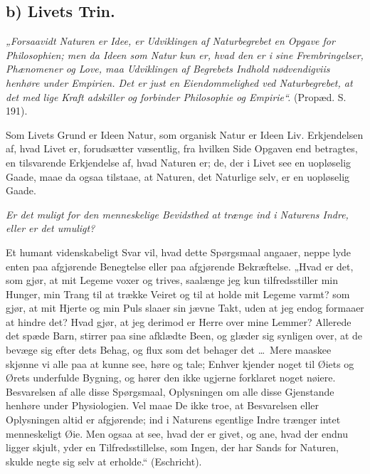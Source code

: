 \documentclass[12pt,a4paper]{book}
\begin{document}
\subsection*{b) Livets Trin.}

\emph{„Forsaavidt Naturen er Idee, er Udviklingen af Naturbegrebet en
Opgave for Philosophien; men da Ideen som Natur kun er, hvad den er i
sine Frembringelser, Phænomener og Love, maa Udviklingen af Begrebets
Indhold nødvendigviis henhøre under Empirien. Det er just en
Eiendommelighed ved Naturbegrebet, at det med lige Kraft adskiller og
forbinder Philosophie og Empirie“.} (Propæd. S. 191).

Som Livets Grund er Ideen Natur, som organisk Natur er Ideen Liv.
Erkjendelsen af, hvad Livet er, forudsætter væsentlig, fra hvilken Side
Opgaven end betragtes, en tilsvarende Erkjendelse af, hvad Naturen er;
de, der i Livet see en uopløselig Gaade, maae da ogsaa tilstaae, at
Naturen, det Naturlige selv, er en uopløselig Gaade.

\emph{Er det muligt for den menneskelige Bevidsthed at trænge ind i
Naturens Indre, eller er det umuligt?}

Et humant videnskabeligt Svar vil, hvad dette Spørgsmaal angaaer, neppe
lyde enten paa afgjørende Benegtelse eller paa afgjørende Bekræftelse.
„Hvad er det, som gjør, at mit Legeme voxer og trives, saalænge jeg kun
tilfredsstiller min Hunger, min Trang til at trække Veiret og til at
holde mit Legeme varmt? som gjør, at mit Hjerte og min Puls slaaer sin
jævne Takt, uden at jeg endog formaaer at hindre det? Hvad gjør, at jeg
derimod er Herre over mine Lemmer? Allerede det spæde Barn, stirrer paa
sine afklædte Been, og
glæder sig synligen over, at de bevæge sig efter dets Behag, og flux som
det behager det \dots\ Mere maaskee skjønne vi alle paa at kunne see,
høre og tale; Enhver kjender noget til Øiets og Ørets underfulde
Bygning, og hører den ikke ugjerne forklaret noget nøiere. Besvarelsen
af alle disse Spørgsmaal, Oplysningen om alle disse Gjenstande henhøre
under Physiologien. Vel maae De ikke troe, at Besvarelsen eller
Oplysningen altid er afgjørende; ind i Naturens egentlige Indre trænger
intet menneskeligt Øie. Men ogsaa at see, hvad der er givet, og ane,
hvad der endnu ligger skjult, yder en Tilfredsstillelse, som Ingen, der
har Sands for Naturen, skulde negte sig selv at erholde.“ (Eschricht).
\end{document}
